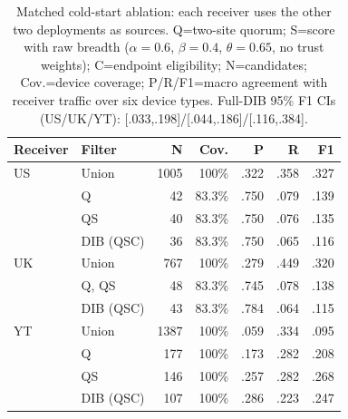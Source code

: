 \documentclass[journal]{IEEEtran}
\theoremstyle{definition}
\begin{document}
\begin{table}[t]
\centering
\caption{Matched cold-start ablation: each receiver uses the other two deployments as sources. Q=two-site quorum; S=score with raw breadth ($\alpha=0.6$, $\beta=0.4$, $\theta=0.65$, no trust weights); C=endpoint eligibility; N=candidates; Cov.=device coverage; P/R/F1=macro agreement with receiver traffic over six device types. Full-DIB 95\% F1 CIs (US/UK/YT): [.033,.198]/[.044,.186]/[.116,.384].}
\label{tab:threelab}
\scriptsize
\begin{tabular}{@{}llrrrrr@{}}
\toprule
Receiver & Filter & N & Cov. & P & R & F1 \\
\midrule
US & Union & 1005 & 100\% & .322 & .358 & .327 \\
 & Q & 42 & 83.3\% & .750 & .079 & .139 \\
 & QS & 40 & 83.3\% & .750 & .076 & .135 \\
 & DIB (QSC) & 36 & 83.3\% & .750 & .065 & .116 \\
\midrule
UK & Union & 767 & 100\% & .279 & .449 & .320 \\
 & Q, QS & 48 & 83.3\% & .745 & .078 & .138 \\
 & DIB (QSC) & 43 & 83.3\% & .784 & .064 & .115 \\
\midrule
YT & Union & 1387 & 100\% & .059 & .334 & .095 \\
 & Q & 177 & 100\% & .173 & .282 & .208 \\
 & QS & 146 & 100\% & .257 & .282 & .268 \\
 & DIB (QSC) & 107 & 100\% & .286 & .223 & .247 \\
\bottomrule
\end{tabular}
\end{table}
\end{document}
